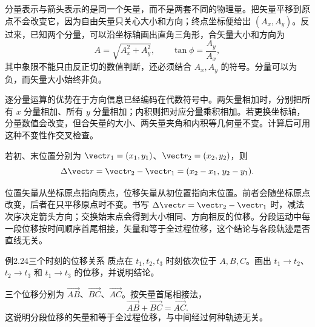 分量表示与箭头表示的是同一个矢量，而不是两套不同的物理量。把矢量平移到原点不会改变它，因为自由矢量只关心大小和方向；终点坐标便给出 $(A_x,A_y)$。反过来，已知两个分量，可以沿坐标轴画出直角三角形，合矢量大小和方向为
\begin{equation}
 A=\sqrt{A_x^2+A_y^2},\qquad
 \tan\phi=\frac{A_y}{A_x},
\end{equation}
其中象限不能只由反正切的数值判断，还必须结合 $A_x,A_y$ 的符号。分量可以为负，而矢量大小始终非负。

逐分量运算的优势在于方向信息已经编码在代数符号中。两矢量相加时，分别把所有 $x$ 分量相加、所有 $y$ 分量相加；内积则把对应分量乘积相加。若更换坐标轴，分量数值会改变，但合矢量的大小、两矢量夹角和内积等几何量不变。计算后可用这种不变性作交叉检查。

若初、末位置分别为 $\vect r_1=(x_1,y_1)$、$\vect r_2=(x_2,y_2)$，则
\begin{equation}
\Delta\vect r=\vect r_2-\vect r_1=(x_2-x_1,\,y_2-y_1).
\end{equation}

位置矢量从坐标原点指向质点，位移矢量从初位置指向末位置。前者会随坐标原点改变，后者在只平移原点时不变。书写 $\Delta\vect r=\vect r_2-\vect r_1$ 时，减法次序决定箭头方向；交换始末点会得到大小相同、方向相反的位移。分段运动中每一段位移按时间顺序首尾相接，矢量和等于全过程位移，这个结论与各段轨迹是否直线无关。

\begin{origexamplebox}{例2.24\quad 三个时刻的位移关系}
质点在 $t_1,t_2,t_3$ 时刻依次位于 $A,B,C$。画出 $t_1\to t_2$、$t_2\to t_3$ 和 $t_1\to t_3$ 的位移，并说明结论。
\end{origexamplebox}
\begin{xesolution}
三个位移分别为 $\overrightarrow{AB}$、$\overrightarrow{BC}$、$\overrightarrow{AC}$。按矢量首尾相接法，
\[
  \boxed{\overrightarrow{AB}+\overrightarrow{BC}=\overrightarrow{AC}}.
\]
这说明分段位移的矢量和等于全过程位移，与中间经过何种轨迹无关。
\begin{center}\end{center}
\end{xesolution}

